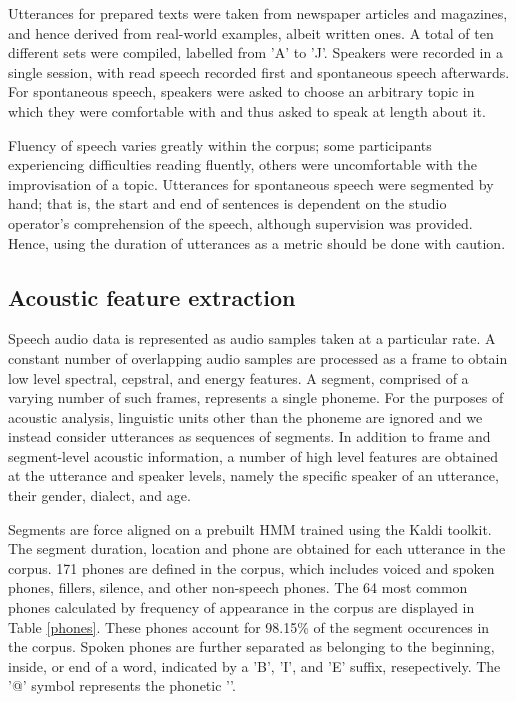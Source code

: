 \documentclass[conference]{IEEEtran}
\begin{document}
Utterances for prepared texts were taken from newspaper articles and magazines, and hence derived from real-world examples, albeit written ones.
A total of ten different sets were compiled, labelled from 'A' to 'J'.
Speakers were recorded in a single session, with read speech recorded first and spontaneous speech afterwards.
For spontaneous speech, speakers were asked to choose an arbitrary topic in which they were comfortable with and thus asked to speak at length about it.

Fluency of speech varies greatly within the corpus; some participants experiencing difficulties reading fluently, others were uncomfortable with the improvisation of a topic.
Utterances for spontaneous speech were segmented by hand; that is, the start and end of sentences is dependent on the studio operator's comprehension of the speech, although supervision was provided.
Hence, using the duration of utterances as a metric should be done with caution.

\subsection{Acoustic feature extraction}

Speech audio data is represented as audio samples taken at a particular rate.
A constant number of overlapping audio samples are processed as a frame to obtain low level spectral, cepstral, and energy features.
A segment, comprised of a varying number of such frames, represents a single phoneme.
For the purposes of acoustic analysis, linguistic units other than the phoneme are ignored and we instead consider utterances as sequences of segments.
In addition to frame and segment-level acoustic information, a number of high level features are obtained at the utterance and speaker levels, namely the specific speaker of an utterance, their gender, dialect, and age.

Segments are force aligned on a prebuilt HMM trained using the Kaldi toolkit.
The segment duration, location and phone are obtained for each utterance in the corpus.
171 phones are defined in the corpus, which includes voiced and spoken phones, fillers, silence, and other non-speech phones.
The 64 most common phones calculated by frequency of appearance in the corpus are displayed in Table \ref{phones}.
These phones account for 98.15\% of the segment occurences in the corpus.
Spoken phones are further separated as belonging to the beginning, inside, or end of a word, indicated by a 'B', 'I', and 'E' suffix, resepectively.
The '@' symbol represents the phonetic ''.
\end{document}
